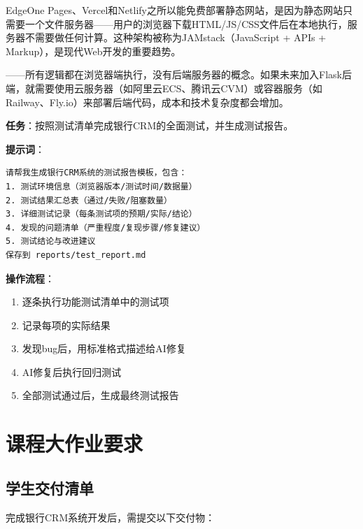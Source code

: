 \begin{theorybox}[静态网站部署的技术原理]
EdgeOne Pages、Vercel和Netlify之所以能免费部署静态网站，是因为静态网站只需要一个文件服务器——用户的浏览器下载HTML/JS/CSS文件后在本地执行，服务器不需要做任何计算。这种架构被称为JAMstack（JavaScript + APIs + Markup），是现代Web开发的重要趋势。\par\n{}——所有逻辑都在浏览器端执行，没有后端服务器的概念。如果未来加入Flask后端，就需要使用云服务器（如阿里云ECS、腾讯云CVM）或容器服务（如Railway、Fly.io）来部署后端代码，成本和技术复杂度都会增加。\end{theorybox}

\begin{practicebox}[完整测试流程]
\textbf{任务}：按照测试清单完成银行CRM的全面测试，并生成测试报告。

\textbf{提示词}：

\begin{lstlisting}
请帮我生成银行CRM系统的测试报告模板，包含：
1. 测试环境信息（浏览器版本/测试时间/数据量）
2. 测试结果汇总表（通过/失败/阻塞数量）
3. 详细测试记录（每条测试项的预期/实际/结论）
4. 发现的问题清单（严重程度/复现步骤/修复建议）
5. 测试结论与改进建议
保存到 reports/test_report.md
\end{lstlisting}

\textbf{操作流程}：
\begin{enumerate}[leftmargin=2em]
  \item 逐条执行功能测试清单中的测试项
  \item 记录每项的实际结果
  \item 发现bug后，用标准格式描述给AI修复
  \item AI修复后执行回归测试
  \item 全部测试通过后，生成最终测试报告
\end{enumerate}
\end{practicebox}

\section{课程大作业要求}

\subsection{学生交付清单}

完成银行CRM系统开发后，需提交以下交付物：

